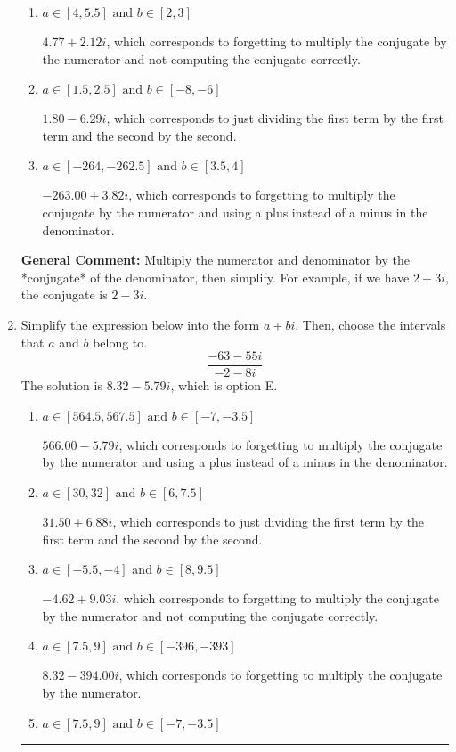 \documentclass{extbook}[14pt]
\newcommand{\litem}[1]{\item #1

\rule{\textwidth}{0.4pt}}
\begin{document}
\begin{enumerate}
{\begin{enumerate}[label=\Alph*.]
 $-3.55  + 283.00 i$, which corresponds to forgetting to multiply the conjugate by the numerator.
\item \( a \in [4, 5.5] \text{ and } b \in [2, 3] \)

 $4.77  + 2.12 i$, which corresponds to forgetting to multiply the conjugate by the numerator and not computing the conjugate correctly.
\item \( a \in [1.5, 2.5] \text{ and } b \in [-8, -6] \)

 $1.80  - 6.29 i$, which corresponds to just dividing the first term by the first term and the second by the second.
\item \( a \in [-264, -262.5] \text{ and } b \in [3.5, 4] \)

 $-263.00  + 3.82 i$, which corresponds to forgetting to multiply the conjugate by the numerator and using a plus instead of a minus in the denominator.
\end{enumerate}

\textbf{General Comment:} Multiply the numerator and denominator by the *conjugate* of the denominator, then simplify. For example, if we have $2+3i$, the conjugate is $2-3i$.
}
\litem{
Simplify the expression below into the form $a+bi$. Then, choose the intervals that $a$ and $b$ belong to.
\[ \frac{-63 - 55 i}{-2 - 8 i} \]The solution is \( 8.32  - 5.79 i \), which is option E.\begin{enumerate}[label=\Alph*.]
\item \( a \in [564.5, 567.5] \text{ and } b \in [-7, -3.5] \)

 $566.00  - 5.79 i$, which corresponds to forgetting to multiply the conjugate by the numerator and using a plus instead of a minus in the denominator.
\item \( a \in [30, 32] \text{ and } b \in [6, 7.5] \)

 $31.50  + 6.88 i$, which corresponds to just dividing the first term by the first term and the second by the second.
\item \( a \in [-5.5, -4] \text{ and } b \in [8, 9.5] \)

 $-4.62  + 9.03 i$, which corresponds to forgetting to multiply the conjugate by the numerator and not computing the conjugate correctly.
\item \( a \in [7.5, 9] \text{ and } b \in [-396, -393] \)

 $8.32  - 394.00 i$, which corresponds to forgetting to multiply the conjugate by the numerator.
\item \( a \in [7.5, 9] \text{ and } b \in [-7, -3.5] \)


\end{enumerate}}
\end{enumerate}
\end{document}
